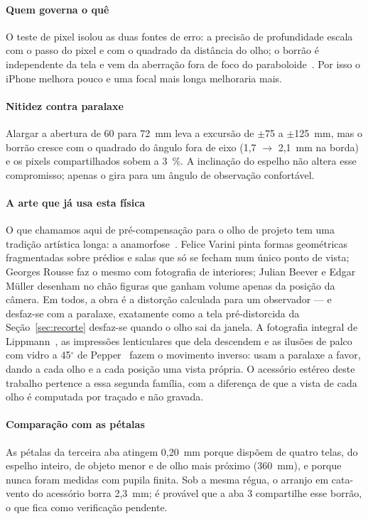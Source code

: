 \documentclass[journal,10pt]{IEEEtran}
\begin{document}
\paragraph{Quem governa o qu\^e} O teste de pixel isolou as duas fontes de erro: a precis\~ao de profundidade escala com o passo do pixel e com o quadrado da dist\^ancia do olho; o borr\~ao \'e independente da tela e vem da aberra\c{c}\~ao fora de foco do paraboloide~\cite{welford1986}. Por isso o iPhone melhora pouco e uma focal mais longa melhoraria mais.

\paragraph{Nitidez contra paralaxe} Alargar a abertura de 60 para 72~mm leva a excurs\~ao de $\pm$75 a $\pm$125~mm, mas o borr\~ao cresce com o quadrado do \^angulo fora de eixo (1,7 $\to$ 2,1~mm na borda) e os pixels compartilhados sobem a 3~\%. A inclina\c{c}\~ao do espelho n\~ao altera esse compromisso; apenas o gira para um \^angulo de observa\c{c}\~ao confort\'avel.

\paragraph{A arte que j\'a usa esta f\'isica} O que chamamos aqui de pr\'e-compensa\c{c}\~ao para o olho de projeto tem uma tradi\c{c}\~ao art\'istica longa: a anamorfose~\cite{baltrusaitis1977}. Felice Varini pinta formas geom\'etricas fragmentadas sobre pr\'edios e salas que s\'o se fecham num \'unico ponto de vista; Georges Rousse faz o mesmo com fotografia de interiores; Julian Beever e Edgar M\"uller desenham no ch\~ao figuras que ganham volume apenas da posi\c{c}\~ao da c\^amera. Em todos, a obra \'e a distor\c{c}\~ao calculada para um observador --- e desfaz-se com a paralaxe, exatamente como a tela pr\'e-distorcida da Se\c{c}\~ao~\ref{sec:recorte} desfaz-se quando o olho sai da janela. A fotografia integral de Lippmann~\cite{lippmann1908}, as impress\~oes lenticulares que dela descendem e as ilus\~oes de palco com vidro a 45$^\circ$ de Pepper~\cite{pepper1890} fazem o movimento inverso: usam a paralaxe a favor, dando a cada olho e a cada posi\c{c}\~ao uma vista pr\'opria. O acess\'orio est\'ereo deste trabalho pertence a essa segunda fam\'ilia, com a diferen\c{c}a de que a vista de cada olho \'e computada por tra\c{c}ado e n\~ao gravada.

\paragraph{Compara\c{c}\~ao com as p\'etalas} As p\'etalas da terceira aba atingem 0,20~mm porque disp\~oem de quatro telas, do espelho inteiro, de objeto menor e de olho mais pr\'oximo (360~mm), e porque nunca foram medidas com pupila finita. Sob a mesma r\'egua, o arranjo em cata-vento do acess\'orio borra 2,3~mm; \'e prov\'avel que a aba 3 compartilhe esse borr\~ao, o que fica como verifica\c{c}\~ao pendente.
\end{document}
